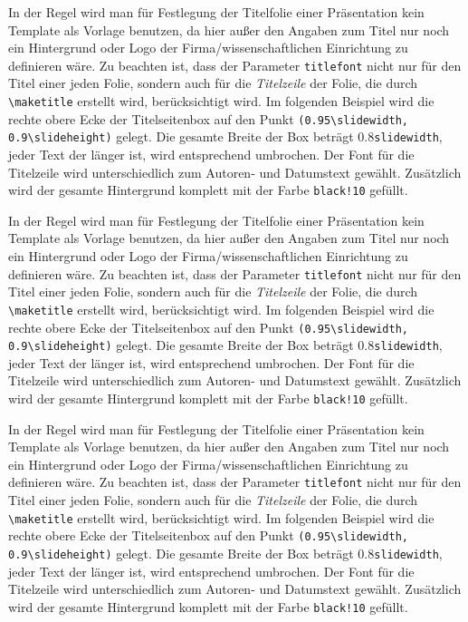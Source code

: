 \documentclass[a4paper,10pt,parskip,ngerman]{scrartcl}
\let\Lkeyword\texttt
\let\Ldim\texttt
\let\LColor\texttt
\def\Largr#1{\texttt{(#1)}}
\def\Lcs#1{\texttt{\textbackslash#1}}
\begin{document}
In der Regel wird man für Festlegung der Titelfolie einer Präsentation
kein Template als Vorlage benutzen, da hier außer den
Angaben zum Titel nur noch ein Hintergrund oder Logo der
Firma/wissenschaftlichen Einrichtung zu definieren wäre.
Zu beachten ist, dass der Parameter \Lkeyword{titlefont} nicht nur für
den Titel einer jeden Folie, sondern auch
für die \emph{Titelzeile} der Folie, die durch \Lcs{maketitle} erstellt
wird, berücksichtigt wird. Im folgenden Beispiel wird
die rechte obere Ecke der Titelseitenbox auf den Punkt
\Largr{0.95\Lcs{slidewidth}, 0.9\Lcs{slideheight}} gelegt. Die gesamte
Breite der Box beträgt  0.8\Ldim{slidewidth}, jeder Text der länger ist,
wird entsprechend umbrochen. Der Font für
die Titelzeile wird unterschiedlich zum Autoren- und Datumstext gewählt.
Zusätzlich wird der gesamte Hintergrund komplett
mit der Farbe \LColor{black!10} gefüllt.


{\selectfont

In der Regel wird man für Festlegung der Titelfolie einer Präsentation
kein Template als Vorlage benutzen, da hier außer den
Angaben zum Titel nur noch ein Hintergrund oder Logo der
Firma/wissenschaftlichen Einrichtung zu definieren wäre.
Zu beachten ist, dass der Parameter \Lkeyword{titlefont} nicht nur für
den Titel einer jeden Folie, sondern auch
für die \emph{Titelzeile} der Folie, die durch \Lcs{maketitle} erstellt
wird, berücksichtigt wird. Im folgenden Beispiel wird
die rechte obere Ecke der Titelseitenbox auf den Punkt
\Largr{0.95\Lcs{slidewidth}, 0.9\Lcs{slideheight}} gelegt. Die gesamte
Breite der Box beträgt 0.8\Ldim{slidewidth}, jeder Text der länger ist,
wird entsprechend umbrochen. Der Font für
die Titelzeile wird unterschiedlich zum Autoren- und Datumstext gewählt.
Zusätzlich wird der gesamte Hintergrund komplett
mit der Farbe \LColor{black!10} gefüllt.
}


{\selectfont

In der Regel wird man für Festlegung der Titelfolie einer Präsentation
kein Template als Vorlage benutzen, da hier außer den
Angaben zum Titel nur noch ein Hintergrund oder Logo der
Firma/wissenschaftlichen Einrichtung zu definieren wäre.
Zu beachten ist, dass der Parameter \Lkeyword{titlefont} nicht nur für
den Titel einer jeden Folie, sondern auch
für die \emph{Titelzeile} der Folie, die durch \Lcs{maketitle} erstellt
wird, berücksichtigt wird. Im folgenden Beispiel wird
die rechte obere Ecke der Titelseitenbox auf den Punkt
\Largr{0.95\Lcs{slidewidth}, 0.9\Lcs{slideheight}} gelegt. Die gesamte
Breite der Box beträgt 0.8\Ldim{slidewidth}, jeder Text der länger ist,
wird entsprechend umbrochen. Der Font für
die Titelzeile wird unterschiedlich zum Autoren- und Datumstext gewählt.
Zusätzlich wird der gesamte Hintergrund komplett
mit der Farbe \LColor{black!10} gefüllt.
}
\end{document}
